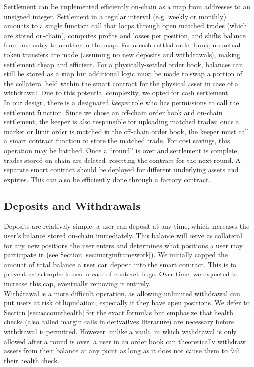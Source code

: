 \documentclass{article}
\begin{document}
Settlement can be implemented efficiently on-chain as a map from addresses to an unsigned integer. Settlement in a regular interval (e.g. weekly or monthly) amounts to a single function call that loops through open matched trades (which are stored on-chain), computes profits and losses per position, and shifts balance from one entry to another in the map.
For a cash-settled order book, no actual token transfers are made (assuming no new deposits and withdrawals), making settlement cheap and efficient.
For a physically-settled order book, balances can still be stored as a map but additional logic must be made to swap a portion of the collateral held within the smart contract for the physical asset in case of a withdrawal. Due to this potential complexity, we opted for cash settlement.\\

\noindent In our design, there is a designated \textit{keeper} role who has permissions to call the settlement function.
Since we chose an off-chain order book and on-chain settlement, the keeper is also responsible for uploading matched trades: once a market or limit order is matched in the off-chain order book, the keeper must call a smart contract function to store the matched trade. For cost savings, this operation may be batched.
Once a ``round'' is over and settlement is complete, trades stored on-chain are deleted, resetting the contract for the next round. 
A separate smart contract should be deployed for different underlying assets and expiries. This can also be efficiently done through a factory contract. 

\subsection{Deposits and Withdrawals}

Deposits are relatively simple: a user can deposit at any time, which increases the user's balance stored on-chain immediately. This balance will serve as collateral for any new positions the user enters and determines what positions a user may participate in (see Section \ref{sec:marginframework}). 
We initially capped the amount of total balance a user can deposit into the smart contract. This is to prevent catastrophe losses in case of contract bugs. Over time, we expected to increase this cap, eventually removing it entirely.\\

\noindent Withdrawal is a more difficult operation, as allowing unlimited withdrawal can put users at risk of liquidation, especially if they have open positions. We defer to Section \ref{sec:accounthealth} for the exact formulas but emphasize that health checks (also called margin calls in derivatives literature) are necessary before withdrawal is permitted. However, unlike a vault, in which withdrawal is only allowed after a round is over, a user in an order book can theoretically withdraw assets from their balance at any point as long as it does not cause them to fail their health check. 
\end{document}
